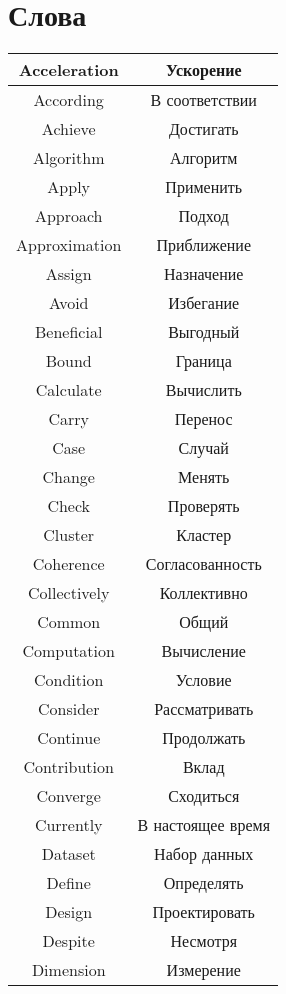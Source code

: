 \newpage
\chapter*{Слова}

\begin{table}[h!]
  \centering
  \begin{tabular}{|*{2}{C{.4}|}} \hline
    Acceleration & Ускорение \\ \hline
    According & В соответствии \\ \hline
    Achieve & Достигать \\ \hline
    Algorithm & Алгоритм \\ \hline
    Apply & Применить \\ \hline
    Approach & Подход \\ \hline
    Approximation & Приближение \\ \hline
    Assign & Назначение \\ \hline
    Avoid & Избегание \\ \hline
    Beneficial & Выгодный \\ \hline
    Bound & Граница \\ \hline
    Calculate & Вычислить \\ \hline
    Carry & Перенос \\ \hline
    Case & Случай \\ \hline
    Change & Менять \\ \hline
    Check & Проверять \\ \hline
    Cluster & Кластер \\ \hline
    Coherence & Согласованность \\ \hline
    Collectively & Коллективно \\ \hline
    Common & Общий \\ \hline
    Computation & Вычисление \\ \hline
    Condition & Условие \\ \hline
    Consider & Рассматривать \\ \hline
    Continue & Продолжать \\ \hline
    Contribution & Вклад \\ \hline
    Converge & Сходиться \\ \hline
    Currently & В настоящее время \\ \hline
    Dataset & Набор данных \\ \hline
    Define & Определять \\ \hline
    Design & Проектировать \\ \hline
    Despite & Несмотря \\ \hline
    Dimension & Измерение \\ \hline
  \end{tabular}
\end{table}

